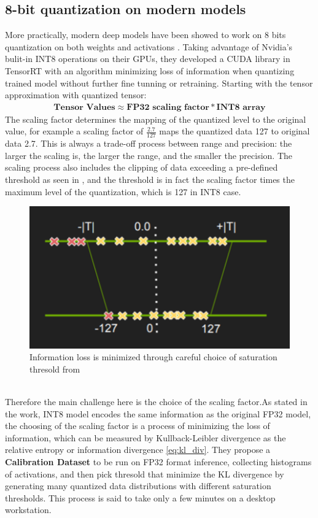 \subsection{8-bit quantization on modern models}
More practically, modern deep models have been showed to work on 8 bits quantization on both weights and activations \cite{TensorRT8bit}. Taking advantage of Nvidia's bulit-in INT8 operations on their GPUs, they developed a CUDA library in TensorRT with an algorithm minimizing loss of information when quantizing trained model without further fine tunning or retraining. Starting with the tensor approximation with quantized tensor:
\begin{equation}
    \begin{aligned}\label{eq:tensorrtop}
    \textbf{Tensor Values}\approx\textbf{FP32 scaling factor}*\textbf{INT8 array}
    \end{aligned}
\end{equation}
 The scaling factor determines the mapping of the quantized level to the original value, for example a scaling factor of $\frac{2.7}{127}$ maps the quantized data 127 to original data 2.7. This is always a trade-off process between range and precision: the larger the scaling is, the larger the range, and the smaller the precision. The scaling process also includes the clipping of data exceeding a pre-defined threshold as seen in , and the threshold is in fact the scaling factor times the maximum level of the quantization, which is 127 in INT8 case.
\begin{figure}
    \centering
    \includegraphics[width=0.5\linewidth]{inc/2_related_work/figure/tensorrt_thresold.png}
    \caption{Information loss is minimized through careful choice of saturation thresold from \cite{TensorRT8bit}}
    \label{fig:tensorrt_thresold}
\end{figure}
\\
Therefore the main challenge here is the choice of the scaling factor.As stated in the work, INT8 model encodes the same information as the original FP32 model, the choosing of the scaling factor is a process of minimizing the loss of information, which can be measured by Kullback-Leibler divergence as the relative entropy or information divergence \eqref{eq:kl_div}. They propose a \textbf{Calibration Dataset} to be run on FP32 format inference, collecting histograms of activations, and then pick thresold that minimize the KL divergence by generating many quantized data distributions with different saturation thresholds. This process is said to take only a few minutes on a desktop workstation. \\ 
